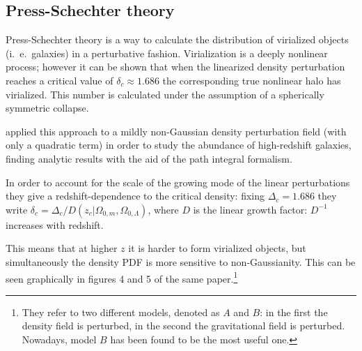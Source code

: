 \documentclass[main.tex]{subfiles}
\begin{document}
\subsection{Press-Schechter theory}

Press-Schechter theory is a way to calculate the distribution of virialized objects (i.\ e.\ galaxies) in a perturbative fashion.
Virialization is a deeply nonlinear process; however it can be shown that when the linearized density perturbation reaches a critical value of \(\delta _c \approx 1.686\) the corresponding true nonlinear halo has virialized.  This number is calculated under the assumption of a spherically symmetric collapse.

\textcite[]{matarreseAbundanceHighRedshift2000} applied this approach to a mildly non-Gaussian density perturbation field (with only a quadratic term) in order to study the abundance of high-redshift galaxies, finding analytic results with the aid of the path integral formalism.




In order to account for the scale of the growing mode of the linear perturbations they give a redshift-dependence to the critical density: fixing \(\Delta _c = \num{1.686}\) they write \(\delta _c = \Delta _c / D(z_c  | \Omega_{0, m}, \Omega_{0, \Lambda })\), where \(D\) is the linear growth factor: \(D^{-1}\) increases with redshift.  

This means that at higher \(z\) it is harder to form virialized objects, but simultaneously the density PDF is more sensitive to non-Gaussianity.
This can be seen graphically in figures 4 and 5 of the same paper.\footnote{They refer to two different models, denoted as \(A\) and \(B\): in the first the density field is perturbed, in the second the gravitational field is perturbed. Nowadays, model \(B\) has been found to be the most useful one.}
\end{document}
